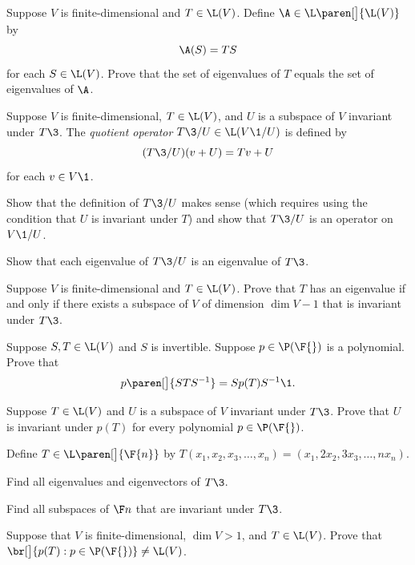 \exercise
Suppose $V$ is finite-dimensional and $T \in \L(V)$. Define $\A \in \L\paren[\big]{\L(V)}$ by \label{LLV}
\[
\A(S) = TS
\]
for each $S \in \L(V)$. Prove that the set of eigenvalues of $T$ equals the set of eigenvalues of $\A$.


\exercise
Suppose $V$ is finite-dimensional, $T \in \L(V)$, and $U$ is a subspace of $V$ invariant under $T\3$. The \emph{quotient operator}
$T\3/U \in \L(V\1/U)$ is defined by\label{5quotient}
\[
(T\3/U)(v + U) = Tv +U
\]
for each $v \in V\1$.
\begin{subtheorem}
\item
Show that the definition of $T\3/U$ makes sense (which requires using the condition that $U$ is invariant under $T$) and show that $T\3/U$ is an operator on $V\1/U$.
\item
Show that each eigenvalue of $T\3/U$ is an eigenvalue of $T\3$.
\end{subtheorem}
\exercisesubtheoremend


\exercise
Suppose $V$ is finite-dimensional and $T \in \L(V)$. Prove that $T$ has an eigenvalue if and only if there exists a subspace of $V$ of dimension $\dim V - 1$ that is invariant under $T\3$.

\exercise
Suppose $S, T \in \L(V)$ and $S$ is invertible.  Suppose $p \in \P(\F{})$ is a polynomial. Prove that
\[
p\paren[\big]{STS^{-1}} = S p(T) S^{-1}\1.
\]
\exercisedisplayend


\exercise
Suppose $T \in \L(V)$ and $U$ is a subspace of $V$ invariant under $T\3$. Prove that $U$ is invariant under $p(T)$ for every polynomial $p \in \P(\F{})$.\label{InvPoly}


\exercise
Define $T \in \L\paren[\big]{\F{n}}$ by
$
T(x_1, x_2, x_3, \dots, x_n) = (x_1, 2x_2, 3x_3, \dots, n x_n)$.
\begin{subtheorem}
\item
Find all eigenvalues and eigenvectors of $T\3$.
\item
Find all subspaces of $\F n$ that are invariant under $T\3$.
\end{subtheorem}
\exercisesubtheoremend


\exercise
Suppose that $V$ is finite-dimensional, $\dim V > 1$, and $T \in \L(V)$. Prove that
$
\br[\big]{p(T): p \in \P(\F{})} \ne \L(V)$.


